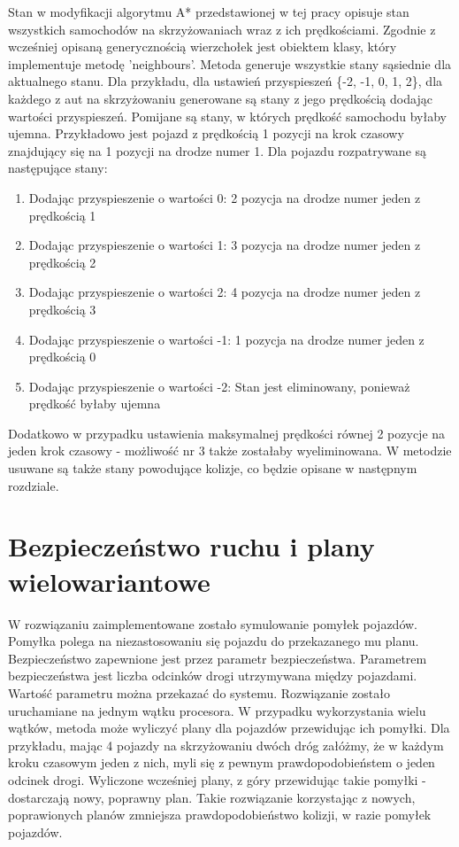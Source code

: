 Stan w modyfikacji algorytmu A* przedstawionej w tej pracy opisuje stan wszystkich samochodów na skrzyżowaniach wraz z ich prędkościami. Zgodnie z wcześniej opisaną generycznością wierzchołek jest obiektem klasy, który implementuje metodę 'neighbours'. Metoda generuje wszystkie stany sąsiednie dla aktualnego stanu. Dla przykładu, dla ustawień przyspieszeń \{-2, -1, 0, 1, 2\}, dla każdego z aut na skrzyżowaniu generowane są stany z jego prędkością dodając wartości przyspieszeń. Pomijane są stany, w których prędkość samochodu byłaby ujemna. Przykładowo jest pojazd z prędkością 1 pozycji na krok czasowy znajdujący się na 1 pozycji na drodze numer 1. Dla pojazdu rozpatrywane są następujące stany:
\begin{enumerate}
\item Dodając przyspieszenie o wartości 0: 2 pozycja na drodze numer jeden z prędkością 1
\item Dodając przyspieszenie o wartości 1: 3 pozycja na drodze numer jeden z prędkością 2
\item Dodając przyspieszenie o wartości 2: 4 pozycja na drodze numer jeden z prędkością 3
\item Dodając przyspieszenie o wartości -1: 1 pozycja na drodze numer jeden z prędkością 0
\item Dodając przyspieszenie o wartości -2: Stan jest eliminowany, ponieważ prędkość byłaby ujemna
\end{enumerate}
Dodatkowo w przypadku ustawienia maksymalnej prędkości równej 2 pozycje na jeden krok czasowy - możliwość nr 3 także zostałaby wyeliminowana.
\newline
\newline
W metodzie usuwane są także stany powodujące kolizje, co będzie opisane w następnym rozdziale.

\section{Bezpieczeństwo ruchu i plany wielowariantowe}

W rozwiązaniu zaimplementowane zostało symulowanie pomyłek pojazdów. Pomyłka polega na niezastosowaniu się pojazdu do przekazanego mu planu. Bezpieczeństwo zapewnione jest przez parametr bezpieczeństwa. Parametrem bezpieczeństwa jest liczba odcinków drogi utrzymywana między pojazdami. Wartość parametru można przekazać do systemu.
\newline
\indent
Rozwiązanie zostało uruchamiane na jednym wątku procesora. W przypadku wykorzystania wielu wątków, metoda może wyliczyć plany dla pojazdów przewidując ich pomyłki. Dla przykładu, mając 4 pojazdy na skrzyżowaniu dwóch dróg załóżmy, że w każdym kroku czasowym jeden z nich, myli się z pewnym prawdopodobieństem o jeden odcinek drogi. Wyliczone wcześniej plany, z góry przewidując takie pomyłki - dostarczają nowy, poprawny plan. Takie rozwiązanie korzystając z nowych, poprawionych planów zmniejsza prawdopodobieństwo kolizji, w razie pomyłek pojazdów.

